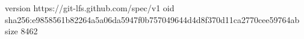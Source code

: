 version https://git-lfs.github.com/spec/v1
oid sha256:e9858561b82264a5a06da5947f0b757049644d4d8f370d11ca2770cee59764ab
size 8462
